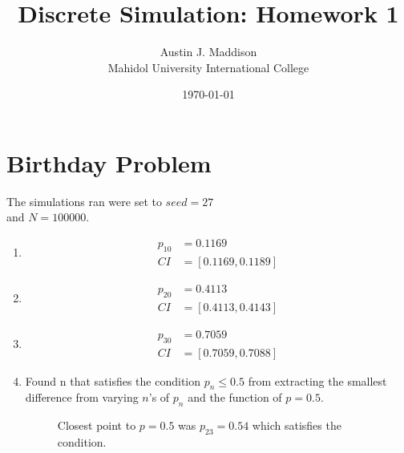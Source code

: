 \documentclass[twocolumn]{article}
\newcommand{\authorname}{Austin J. Maddison}
\begin{document}
\fontsize{9}{11.5}\selectfont %



\title{Discrete Simulation: Homework 1}
\author{\small \authorname \\ \small Mahidol University International College}
\date{\small \today}


%
\twocolumn[{
  \maketitle
}]

\section{Birthday Problem}\label{p1}

The simulations ran were set to $seed=27$ \\and $N=100000$.

\begin{enumerate}[label=\alph*)]
    
\item \begin{align*}
p_{10} &= 0.1169 \\
CI &= [0.1169, 0.1189]
\end{align*}
    
\item \begin{align*}
p_{20} &=  0.4113 \\
CI &= [0.4113, 0.4143]
\end{align*}

\item \begin{align*}
p_{30} &= 0.7059 \\
CI &= [0.7059, 0.7088]
\end{align*}


\item 
Found n that satisfies the condition $p_n \le 0.5$  from extracting the smallest difference from varying $n$'s of $p_n$ and the function of $p=0.5$.

	
\begin{figure}[H]
    \centering
    \caption{Closest point to $p=0.5$ was $p_{23}=0.54$ which satisfies the condition.}
\end{figure}

\end{enumerate}
\end{document}
